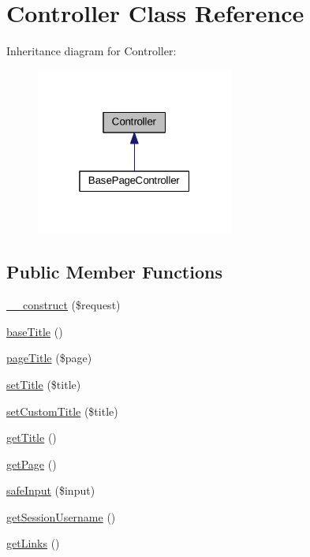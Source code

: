\hypertarget{classController}{\section{Controller Class Reference}
\label{classController}
}


Inheritance diagram for Controller\+:\nopagebreak
\begin{figure}[H]
\begin{center}
\leavevmode
\includegraphics[width=184pt]{classController__inherit__graph}
\end{center}
\end{figure}
\subsection*{Public Member Functions}
\begin{DoxyCompactItemize}
\item 
\hyperlink{classController_ab91faf91a99b21a429324499f9ec9f70}{\+\_\+\+\_\+construct} (\$request)
\item 
\hyperlink{classController_a3057228d46eddceb352a1537ef05e8b7}{base\+Title} ()
\item 
\hyperlink{classController_a555247a38f8b4ea98a85bed7c6798e0a}{page\+Title} (\$page)
\item 
\hyperlink{classController_ae560b1221cb9f3891c432c3dd0292922}{set\+Title} (\$title)
\item 
\hyperlink{classController_af3f91509e2fbae1fd863df1577fcc4e7}{set\+Custom\+Title} (\$title)
\item 
\hyperlink{classController_ae8b4904843b2d665164620160b3c7157}{get\+Title} ()
\item 
\hyperlink{classController_aa844281accdd5aa2ca1ab1d890332b76}{get\+Page} ()
\item 
\hyperlink{classController_a90590c2cd8c1a89cc6eada64f0f24361}{safe\+Input} (\$input)
\item 
\hyperlink{classController_ac85206dce558e214f72fc3ca56f8cc31}{get\+Session\+Username} ()
\item 
\hyperlink{classController_a50e4138bea238a7bba318fffb948eeb1}{get\+Links} ()
\end{DoxyCompactItemize}
